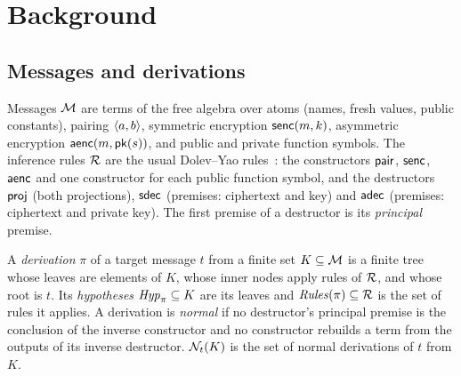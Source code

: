 \section{Background}
\label{sec:background}

\subsection{Messages and derivations}
Messages $\mathcal{M}$ are terms of the free algebra over atoms (names, fresh values, public constants), pairing $\langle a,b\rangle$, symmetric encryption $\mathsf{senc}(m,k)$, asymmetric encryption $\mathsf{aenc}(m,\mathsf{pk}(s))$, and public and private function symbols. The inference rules $\mathcal{R}$ are the usual Dolev--Yao rules~\cite{dolev1983security}: the constructors $\mathsf{pair}$, $\mathsf{senc}$, $\mathsf{aenc}$ and one constructor for each public function symbol, and the destructors $\mathsf{proj}$ (both projections), $\mathsf{sdec}$ (premises: ciphertext and key) and $\mathsf{adec}$ (premises: ciphertext and private key). The first premise of a destructor is its \emph{principal} premise.

A \emph{derivation} $\pi$ of a target message $t$ from a finite set $K\subseteq\mathcal{M}$ is a finite tree whose leaves are elements of $K$, whose inner nodes apply rules of $\mathcal{R}$, and whose root is $t$. Its \emph{hypotheses} $\mathit{Hyp}_\pi\subseteq K$ are its leaves and $\mathit{Rules}(\pi)\subseteq\mathcal{R}$ is the set of rules it applies. A derivation is \emph{normal} if no destructor's principal premise is the conclusion of the inverse constructor and no constructor rebuilds a term from the outputs of its inverse destructor. $\mathcal{N}_t(K)$ is the set of normal derivations of $t$ from $K$.

